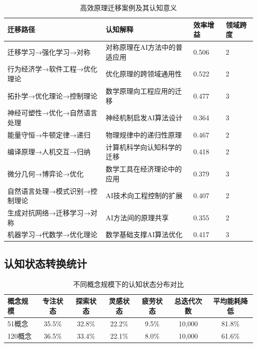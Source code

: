 \documentclass[12pt,a4paper]{article}
\begin{document}
\begin{table}[H]
\centering
\caption{高效原理迁移案例及其认知意义}
\label{tab:efficient_migrations}
\begin{tabular}{p{3.5cm}p{4cm}p{1.8cm}p{1.8cm}}
\toprule
\textbf{迁移路径} & \textbf{认知解释} & \textbf{效率增益} & \textbf{领域跨度} \\
\midrule
迁移学习→强化学习→对称 & 对称原理在AI方法中的普适应用 & 0.506 & 2 \\
行为经济学→软件工程→优化理论 & 优化原理的跨领域通用性 & 0.522 & 2 \\
拓扑学→优化理论→控制理论 & 数学原理向工程应用的迁移 & 0.477 & 3 \\
神经可塑性→优化→自然语言处理 & 神经机制启发AI算法设计 & 0.364 & 3 \\
能量守恒→牛顿定律→递归 & 物理规律中的递归性原理 & 0.467 & 2 \\
编译原理→人机交互→归纳 & 计算机科学向认知科学的迁移 & 0.418 & 2 \\
微分几何→博弈论→优化 & 数学工具在经济理论中的应用 & 0.379 & 3 \\
自然语言处理→模式识别→控制理论 & AI技术向工程控制的扩展 & 0.407 & 2 \\
生成对抗网络→迁移学习→对称 & AI方法间的原理共享 & 0.355 & 2 \\
机器学习→代数学→优化理论 & 数学基础支撑AI算法优化 & 0.417 & 3 \\
\bottomrule
\end{tabular}
\end{table}

\subsection{认知状态转换统计}

\begin{table}[H]
\centering
\caption{不同概念规模下的认知状态分布对比}
\label{tab:cognitive_states_comparison}
\begin{tabular}{p{3cm}cccccc}
\toprule
\textbf{概念规模} & \textbf{专注状态} & \textbf{探索状态} & \textbf{灵感状态} & \textbf{疲劳状态} & \textbf{总迭代次数} & \textbf{平均能耗降低} \\
\midrule
51概念 & 35.5\% & 32.8\% & 22.2\% & 9.5\% & 10,000 & 81.8\% \\
120概念 & 36.5\% & 33.4\% & 22.1\% & 8.0\% & 10,000 & 61.6\% \\
\bottomrule
\end{tabular}
\end{table}
\end{document}

